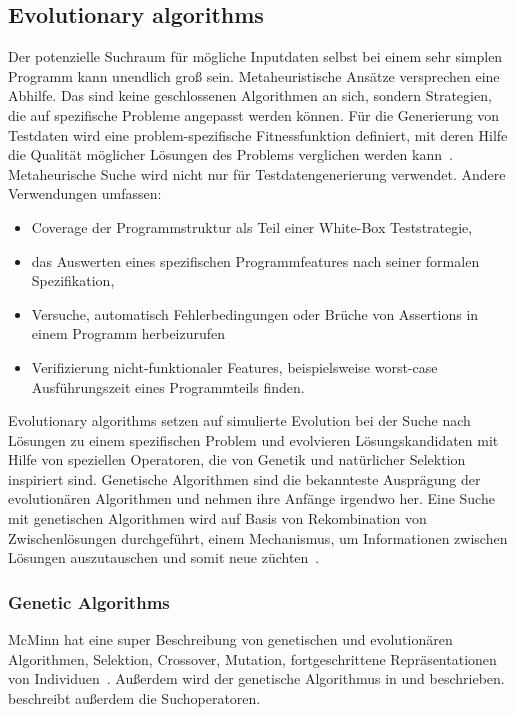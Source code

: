 \documentclass{article}
\begin{document}
\subsection{Evolutionary algorithms}
Der potenzielle Suchraum für mögliche Inputdaten selbst bei einem sehr simplen Programm kann unendlich groß sein. Metaheuristische Ansätze versprechen eine Abhilfe. Das sind keine geschlossenen Algorithmen an sich, sondern Strategien, die auf spezifische Probleme angepasst werden können. Für die Generierung von Testdaten wird eine problem-spezifische Fitnessfunktion definiert, mit deren Hilfe die Qualität möglicher Lösungen des Problems verglichen werden kann~\cite{McMinn_2004}. Metaheurische Suche wird nicht nur für Testdatengenerierung verwendet. Andere Verwendungen umfassen:
\begin{itemize}
	\item Coverage der Programmstruktur als Teil einer White-Box Teststrategie,
	\item das Auswerten eines spezifischen Programmfeatures nach seiner formalen Spezifikation,
	\item Versuche, automatisch Fehlerbedingungen oder Brüche von Assertions in einem Programm herbeizurufen
	\item Verifizierung nicht-funktionaler Features, beispielsweise worst-case Ausführungszeit eines Programmteils finden.
\end{itemize}
Evolutionary algorithms setzen auf simulierte Evolution bei der Suche nach Lösungen zu einem spezifischen Problem und evolvieren Lösungskandidaten mit Hilfe von speziellen Operatoren, die von Genetik und natürlicher Selektion inspiriert sind. Genetische Algorithmen sind die bekannteste Ausprägung der evolutionären Algorithmen und nehmen ihre Anfänge irgendwo her.  Eine Suche mit genetischen Algorithmen wird auf Basis von Rekombination von Zwischenlösungen durchgeführt, einem Mechanismus, um Informationen zwischen Lösungen auszutauschen und somit neue züchten~\cite{McMinn_2004}.

\subsubsection{Genetic Algorithms}
McMinn hat eine super Beschreibung von genetischen und evolutionären Algorithmen, Selektion, Crossover, Mutation, fortgeschrittene Repräsentationen von Individuen~\cite{McMinn_2004}. Außerdem wird der genetische Algorithmus in \cite{Fraser2011} und \cite{Fraser_2013} beschrieben. \cite{Fraser_2013} beschreibt außerdem die Suchoperatoren.
\end{document}
